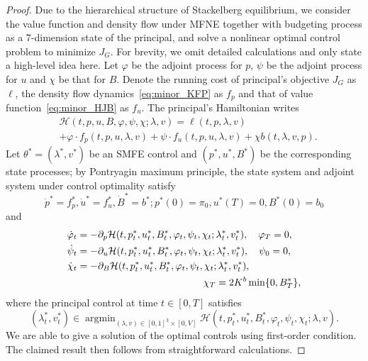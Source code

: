 \documentclass[letterpaper, 10 pt, conference]{ieeeconf}  %
\DeclareMathOperator*{\argmin}{argmin}
\begin{document}
\begin{proof}
    Due to the hierarchical structure of Stackelberg equilibrium, we consider the value function and density flow under MFNE together with budgeting process as a 7-dimension state of the principal, and solve a nonlinear optimal control problem to minimize $J_G$. For brevity, we omit detailed calculations and only state a high-level idea here.
    Let $\varphi$ be the adjoint process for $p$, $\psi$ be the adjoint process for $u$ and $\chi$ be that for $B$. Denote the running cost of principal's objective $J_G$ as $\ell$, the density flow dynamics~\eqref{eq:minor_KFP} as $f_p$ and that of value function~\eqref{eq:minor_HJB} as $f_u$. The principal's Hamiltonian writes
    \small
    \begin{equation}
        \label{eq:p_hamiltonian}
        \begin{aligned}
            &\mathcal{H}(t, p, u, B, \varphi, \psi, \chi ; \lambda, v)=\ell(t, p, \lambda, v)\\ &+\varphi \cdot f_p(t, p, u, \lambda, v) +\psi \cdot f_u(t, p, u, \lambda, v)+\chi b(t, \lambda, v, p).
        \end{aligned}
    \end{equation}
    \normalsize
    Let $\theta^*=\left(\lambda^*, v^*\right)$ be an SMFE control and $(p^*, u^*, B^*)$ be the corresponding state processes; by Pontryagin maximum principle, the state system and adjoint system under control optimality satisfy 
    \small
    $$\dot{p}^*=f_p^*, \dot{u}^*=f_u^*, \dot{B}^*=b^*; p^*(0)=\pi_0, u^*(T)=0, B^*(0)=b_0$$
    \normalsize
    and
    $$\begin{aligned}
    \dot{\varphi}_t&=-\partial_p \mathcal{H}(t, p_t^*, u_t^*, B_t^*, \varphi_t, \psi_t, \chi_t ; \lambda_t^*, v_t^*), \quad \varphi_T=0, \\
\dot{\psi}_t&=-\partial_u \mathcal{H}(t, p_t^*, u_t^*, B_t^*, \varphi_t, \psi_t, \chi_t ; \lambda_t^*, v_t^*), \quad \psi_0=0, \\
\dot{\chi}_t&=-\partial_B \mathcal{H}(t, p_t^*, u_t^*, B_t^*, \varphi_t, \psi_t, \chi_t ; \lambda_t^*, v_t^*), \\& \hspace{4.5cm} \chi_T=2 K^b \min \{0, B_T^*\},
\end{aligned}$$
where the principal control at time $t \in [0,T]$ satisfies
\small $$\left(\lambda_t^*, v_t^*\right) \in \argmin_{(\lambda, v) \in[0,1]^3 \times\left[0,V\right]} \mathcal{H}\left(t, p_t^*, u_t^*, B_t^*, \varphi_t, \psi_t, \chi_t ; \lambda, v\right).$$\normalsize
We are able to give a solution of the optimal controls using first-order condition. The claimed result then follows from straightforward calculations.
\end{proof}
\end{document}
